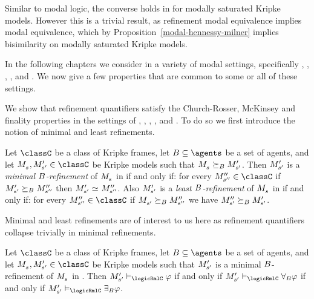 Similar to modal logic, the converse holds in \logicRml{} for modally saturated Kripke models.
However this is a trivial result, as refinement modal equivalence implies modal equivalence, which by Proposition~\ref{modal-hennessy-milner} implies bisimilarity on modally saturated Kripke models.

In the following chapters we consider \logicRml{} in a variety of modal settings, specifically \classK{}, \classKF{}, \classKFF{}, \classKD{}, and \classS{}.
We now give a few properties that are common to some or all of these settings.

We show that refinement quantifiers satisfy the Church-Rosser, McKinsey and finality properties in the settings of \classK{}, \classKF{}, \classKFF{}, \classKD{}, and \classS{}.
To do so we first introduce the notion of minimal and least refinements.

\begin{definition}\label{minimal-refinement}
Let $\classC$ be a class of Kripke frames, let $\agentsB \subseteq \agents$ be a set of agents, and let $\kPModel{\kStateS}, \kPModelP{\kStateSP} \in \classC$ be Kripke models such that $\kPModel{\kStateS} \simulatesBs \kPModelP{\kStateSP}$.
Then ${M^{\prime}_{{s}^{\prime}}}$ is a {\em minimal $B$-refinement} of $\kPModel{\kStateS}$ in \classC{} if and only if: for every $\kPModelPP{\kStateSPP} \in \classC$ if ${M^{\prime}_{{s}^{\prime}}} \succeq_{B} {M^{\prime\prime}_{{s}^{\prime\prime}}}$ then $\kPModelP{\kStateSP} \bisimilar \kPModelPP{\kStateSPP}$.
Also ${M^{\prime}_{{s}^{\prime}}}$ is a {\em least $B$-refinement} of $\kPModel{\kStateS}$ in \classC{} if and only if: for every $\kPModelPP{\kStateSPP} \in \classC$ if $\kPModel{\kStateSP} \simulatesBs \kPModelPP{\kStateSPP}$ we have ${M^{\prime\prime}_{{s}^{\prime}}} \succeq_{B} {M^{\prime}_{{s}^{\prime}}}$.
\end{definition}

Minimal and least refinements are of interest to us here as refinement quantifiers collapse trivially in minimal refinements.

\begin{proposition}\label{minimal-refinement-collapse}
Let $\classC$ be a class of Kripke frames, let $\agentsB \subseteq \agents$ be a set of agents, and let $\kPModel{\kStateS}, \kPModelP{\kStateSP} \in \classC$ be Kripke models such that ${M^{\prime}_{{s}^{\prime}}}$ is a minimal $B$-refinement of $\kPModel{\kStateS}$ in \classC{}.
Then $\kPModelP{\kStateSP} \entails_\logicRmlC \phi$ if and only if $\kPModelP{\kStateSP} \entails_\logicRmlC \allrefsBs \phi$ if and only if $\kPModelP{\kStateSP} \entails_\logicRmlC \somerefsBs \phi$.
\end{proposition}

